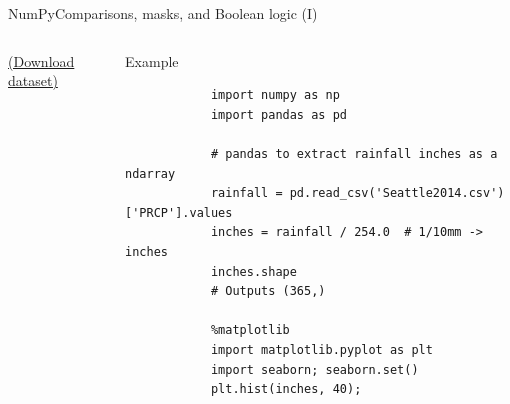 \documentclass[10pt,compress]{beamer} %
\begin{document}
\begin{frame}[fragile]{NumPy}{Comparisons, masks, and Boolean logic (I)}
	\vspace{-0.2cm} 
	\begin{columns}
		\href{https://raw.githubusercontent.com/jakevdp/PythonDataScienceHandbook/master/notebooks/data/Seattle2014.csv}{(Download dataset)}
		\begin{exampleblock}{Example}
		\vspace{-0.2cm} 
			\begin{lstlisting}
			import numpy as np
			import pandas as pd
             
			# pandas to extract rainfall inches as a ndarray
			rainfall = pd.read_csv('Seattle2014.csv')['PRCP'].values
			inches = rainfall / 254.0  # 1/10mm -> inches
			inches.shape 
			# Outputs (365,)
			 
			%matplotlib 
			import matplotlib.pyplot as plt
			import seaborn; seaborn.set()
			plt.hist(inches, 40);
			\end{lstlisting}
		\vspace{-0.2cm} 
		\end{exampleblock}
	\end{columns}
\end{frame}
\end{document}
